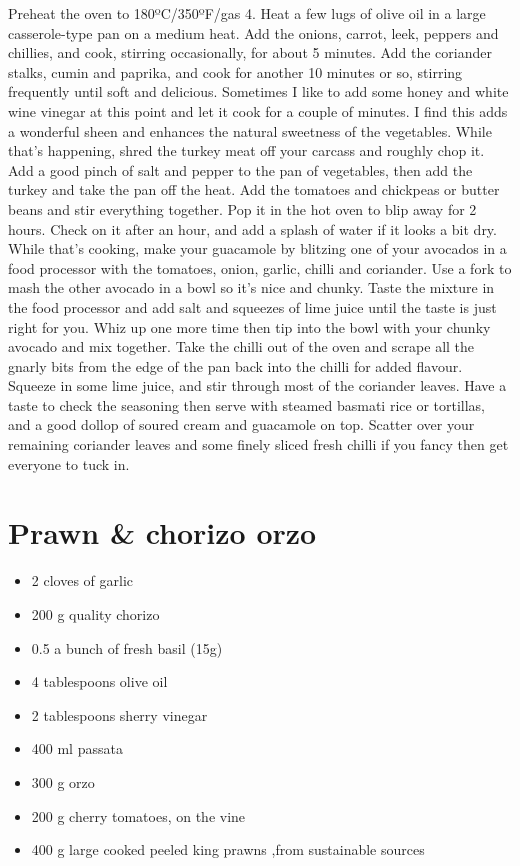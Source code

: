 \documentclass[
]{book}
\providecommand{\tightlist}{%
  \setlength{\itemsep}{0pt}\setlength{\parskip}{0pt}}
\begin{document}
Preheat the oven to 180ºC/350ºF/gas 4. Heat a few lugs of olive oil in a large casserole-type pan on a medium heat. Add the onions, carrot, leek, peppers and chillies, and cook, stirring occasionally, for about 5 minutes. Add the coriander stalks, cumin and paprika, and cook for another 10 minutes or so, stirring frequently until soft and delicious. Sometimes I like to add some honey and white wine vinegar at this point and let it cook for a couple of minutes. I find this adds a wonderful sheen and enhances the natural sweetness of the vegetables.
While that's happening, shred the turkey meat off your carcass and roughly chop it. Add a good pinch of salt and pepper to the pan of vegetables, then add the turkey and take the pan off the heat. Add the tomatoes and chickpeas or butter beans and stir everything together. Pop it in the hot oven to blip away for 2 hours. Check on it after an hour, and add a splash of water if it looks a bit dry.
While that's cooking, make your guacamole by blitzing one of your avocados in a food processor with the tomatoes, onion, garlic, chilli and coriander. Use a fork to mash the other avocado in a bowl so it's nice and chunky. Taste the mixture in the food processor and add salt and squeezes of lime juice until the taste is just right for you. Whiz up one more time then tip into the bowl with your chunky avocado and mix together.
Take the chilli out of the oven and scrape all the gnarly bits from the edge of the pan back into the chilli for added flavour. Squeeze in some lime juice, and stir through most of the coriander leaves. Have a taste to check the seasoning then serve with steamed basmati rice or tortillas, and a good dollop of soured cream and guacamole on top. Scatter over your remaining coriander leaves and some finely sliced fresh chilli if you fancy then get everyone to tuck in.

\hypertarget{prawn-chorizo-orzo}{%
\section{Prawn \& chorizo orzo}\label{prawn-chorizo-orzo}}

\begin{itemize}
\tightlist
\item
  2 cloves of garlic
\item
  200 g quality chorizo
\item
  0.5 a bunch of fresh basil (15g)
\item
  4 tablespoons olive oil
\item
  2 tablespoons sherry vinegar
\item
  400 ml passata
\item
  300 g orzo
\item
  200 g cherry tomatoes, on the vine
\item
  400 g large cooked peeled king prawns ,from sustainable sources
\end{itemize}
\end{document}
